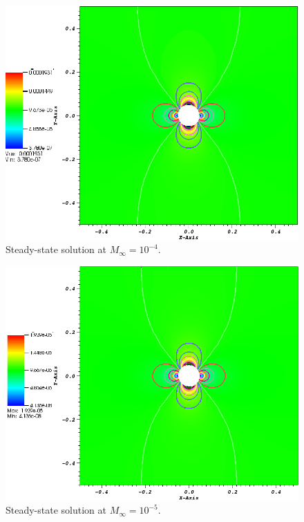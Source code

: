        \begin{figure}[H]%
                \centering
                \includegraphics[scale=.50]{figures/CylinderMach1em4.png}
                \caption{Steady-state solution at $M_{\infty}=10^{-4}$.}
                \label{fig:cyl_1em4}
        \end{figure}   
          
        \begin{figure}[H]%
                \centering
                \includegraphics[scale=.50]{figures/CylinderMach1em5.png}
                \caption{Steady-state solution at $M_{\infty}=10^{-5}$.}
                \label{fig:cyl_1em5}
        \end{figure}
          
